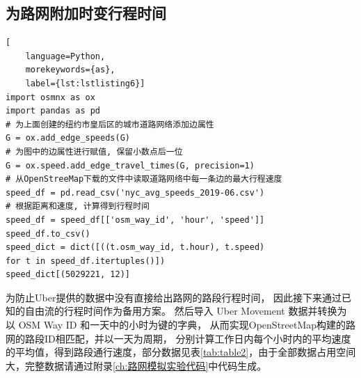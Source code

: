 \subsection{为路网附加时变行程时间}\label{subsec:为路网附加时变行程时间}
\begin{lstlisting}[
    language=Python,
    morekeywords={as},
    label={lst:lstlisting6}]
import osmnx as ox
import pandas as pd
# 为上面创建的纽约市皇后区的城市道路网络添加边属性
G = ox.add_edge_speeds(G)
# 为图中的边属性进行赋值, 保留小数点后一位
G = ox.speed.add_edge_travel_times(G, precision=1)
# 从OpenStreeMap下载的文件中读取道路网络中每一条边的最大行程速度
speed_df = pd.read_csv('nyc_avg_speeds_2019-06.csv')
# 根据距离和速度, 计算得到行程时间
speed_df = speed_df[['osm_way_id', 'hour', 'speed']]
speed_df.to_csv()
speed_dict = dict([((t.osm_way_id, t.hour), t.speed)
for t in speed_df.itertuples()])
speed_dict[(5029221, 12)]
\end{lstlisting}

为防止Uber提供的数据中没有直接给出路网的路段行程时间，
因此接下来通过已知的自由流的行程时间作为备用方案。
然后导入 Uber Movement 数据并转换为以 OSM Way ID 和一天中的小时为键的字典，
从而实现OpenStreetMap构建的路网的路段ID相匹配，并以一天为周期，
分别计算工作日内每个小时内的平均速度的平均值，得到路段通行速度，部分数据见表\ref{tab:table2}，由于全部数据占用空间大，完整数据请通过附录\ref{ch:路网模拟实验代码}中代码生成。

